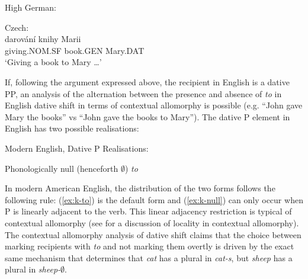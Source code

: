 	\begin{exe}
		\ex High German:\label{german-nom}
		\begin{xlist}

		\end{xlist}
		\ex Czech:\label{czech-nom}\\
		\gll darov\'{a}n\'{i} knihy Marii\\
		giving.NOM.SF book.GEN Mary.DAT\\
		\trans `Giving a book to Mary \ldots \citep[ex. 14]{Dvorak.2009}'
	\end{exe}

	If, following the argument expressed above, the recipient in English is a dative PP, an analysis of the alternation between the presence and absence of \textit{to} in English dative shift in terms of contextual allomorphy is possible (e.g. ``John gave Mary the books'' vs ``John gave the books to Mary''). The dative P element in English has two possible realisations:

	\begin{exe}
		\ex Modern English, Dative P Realisations:
		\begin{xlist}
			\ex Phonologically null\label{ex:k-null} (henceforth $\emptyset$)
			\ex \textit{to}\label{ex:k-to}
		\end{xlist}
	\end{exe}

	In modern American English, the distribution of the two forms follows the following rule: (\ref{ex:k-to}) is the default form and (\ref{ex:k-null}) can only occur when P is linearly adjacent to the verb. This linear adjacency restriction is typical of contextual allomorphy (see \citet{Embick.2010} for a discussion of locality in contextual allomorphy). The contextual allomorphy analysis of dative shift claims that the choice between marking recipients with \textit{to} and not marking them overtly is driven by the exact same mechanism that determines that \textit{cat} has a plural in \textit{cat-s}, but \textit{sheep} has a plural in \textit{sheep-$\emptyset$}.


